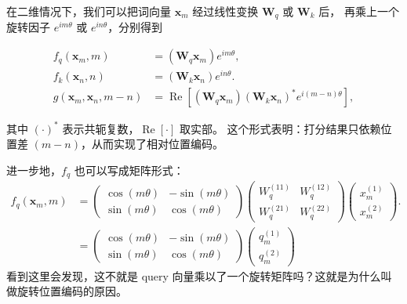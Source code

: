 

在二维情况下，我们可以把词向量 $\mathbf{x}_m$ 经过线性变换 $\mathbf{W}_q$ 或 $\mathbf{W}_k$ 后，
再乘上一个旋转因子 $e^{i m \theta}$ 或 $e^{i n \theta}$，分别得到

\begin{align*}
f_q(\mathbf{x}_m,m) &= (\mathbf{W}_q \mathbf{x}_m) e^{i m \theta},\\
f_k(\mathbf{x}_n,n) &= (\mathbf{W}_k \mathbf{x}_n) e^{i n \theta}.\\
g(\mathbf{x}_m,\mathbf{x}_n,m-n) 
&= \operatorname{Re}\!\left[(\mathbf{W}_q \mathbf{x}_m)(\mathbf{W}_k \mathbf{x}_n)^{*} e^{i (m-n)\theta}\right],
\end{align*}

其中 $(\cdot)^*$ 表示共轭复数，$\operatorname{Re}[\cdot]$ 取实部。
这个形式表明：打分结果只依赖位置差 $(m-n)$，从而实现了相对位置编码。

进一步地，$f_q$ 也可以写成矩阵形式：
\begin{align*}
f_{q}(\mathbf{x}_m, m) &=
\begin{pmatrix}
\cos(m\theta) & -\sin(m\theta) \\
\sin(m\theta) &  \cos(m\theta)
\end{pmatrix}
\begin{pmatrix}
W^{(11)}_q & W^{(12)}_q \\
W^{(21)}_q & W^{(22)}_q
\end{pmatrix}
\begin{pmatrix}
x^{(1)}_m \\
x^{(2)}_m
\end{pmatrix}.\\
&=
\begin{pmatrix}
\cos(m\theta) & -\sin(m\theta) \\
\sin(m\theta) &  \cos(m\theta)
\end{pmatrix}
\begin{pmatrix}
q^{(1)}_m \\
q^{(2)}_m
\end{pmatrix}
\end{align*}
看到这里会发现，这不就是 query 向量乘以了一个旋转矩阵吗？这就是为什么叫做旋转位置编码的原因。




